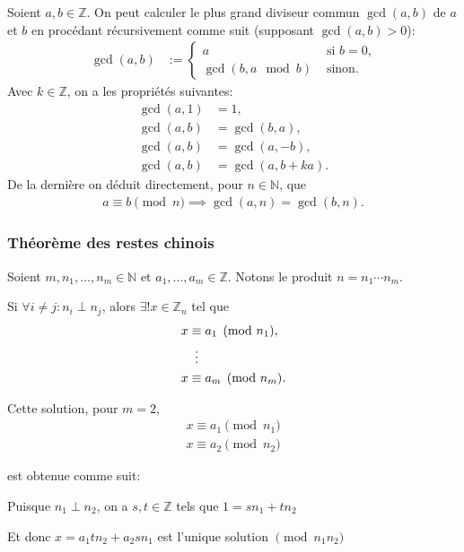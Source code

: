 \documentclass{article}
\begin{document}
Soient $a, b \in \mathbb{Z}$. On peut calculer le plus grand diviseur commun $\gcd(a, b)$ de $a$ et $b$ en procédant récursivement comme suit (supposant $\gcd(a, b) > 0$):
\begin{align*}
    \gcd(a, b) & := \begin{cases}
        a & \text{ si $b = 0$,} \\
        \gcd(b, a \mod b) & \text{ sinon.}
    \end{cases}
\end{align*}
Avec $k \in \mathbb{Z}$, on a les propriétés suivantes:
\begin{align*}
    \gcd(a, 1) & = 1, \\
    \gcd(a, b) & = \gcd(b, a), \\
    \gcd(a, b) &= \gcd(a, -b), \\
    \gcd(a, b) & = \gcd(a, b + ka).
\end{align*}
De la dernière on déduit directement, pour $n \in \mathbb{N}$, que
\begin{align*}
        a \equiv b \pmod n \implies \gcd(a, n) = \gcd(b, n).
\end{align*}

\subsubsection{Théorème des restes chinois}

Soient $m, n_1, \dots, n_m \in \mathbb{N}$ et $a_1, \dots, a_m \in \mathbb{Z}$. Notons le produit $n = n_1 \cdots n_m$.

Si $\forall i \neq j : n_i \perp n_j$, alors $\exists!x \in \mathbb{Z}_n$ tel que
\begin{align*}
    x &\equiv a_1 \pmod {n_1}, \\
    &\vdotswithin{\equiv} \\
    x &\equiv a_m \pmod {n_m}.
\end{align*}

Cette solution, pour $m = 2$,
\begin{align*}
    x \equiv a_1 \pmod {n_1} \\
    x \equiv a_2 \pmod {n_2}
\end{align*}

est obtenue comme suit:

Puisque $n_1 \perp n_2$, on a $s, t \in \mathbb{Z}$ tels que $1 = sn_1 + tn_2$

Et donc $x = a_1tn_2 + a_2sn_1$ est l'unique solution $\pmod {n_1n_2}$
\end{document}
